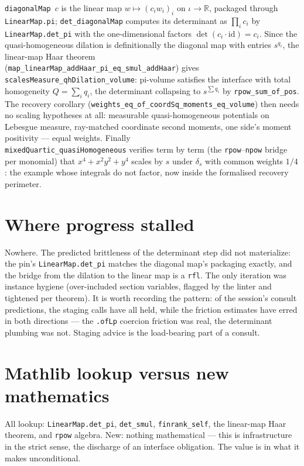 \documentclass[11pt]{article}
\newcommand{\R}{\mathbb{R}}
\newcommand{\code}[1]{\texttt{#1}}
\begin{document}
\code{diagonalMap}~$c$ is the linear map $w \mapsto (c_i w_i)_i$ on
$\iota \to \R$, packaged through \code{LinearMap.pi};
\code{det\_diagonalMap} computes its determinant as $\prod_i c_i$ by
\code{LinearMap.det\_pi} with the one-dimensional factors
$\det(c_i \cdot \mathrm{id}) = c_i$. Since the quasi-homogeneous
dilation is definitionally the diagonal map with entries $s^{q_i}$,
the linear-map Haar theorem\\
(\code{map\_linearMap\_addHaar\_pi\_eq\_smul\_addHaar}) gives\\
\code{scalesMeasure\_qhDilation\_volume}: pi-volume satisfies the
interface with total homogeneity $Q = \sum_i q_i$, the determinant
collapsing to $s^{\sum q_i}$ by \code{rpow\_sum\_of\_pos}. The
recovery corollary
(\code{weights\_eq\_of\_coordSq\_moments\_eq\_volume}) then needs no
scaling hypotheses at all: measurable quasi-homogeneous potentials
on Lebesgue measure, ray-matched coordinate second moments, one
side's moment positivity --- equal weights. Finally\\
\code{mixedQuartic\_quasiHomogeneous} verifies term by term (the
\code{rpow}--\code{npow} bridge per monomial) that
$x^4 + x^2y^2 + y^4$ scales by $s$ under $\delta_s$ with common
weights $1/4$: the example whose integrals do not factor, now inside
the formalised recovery perimeter.

\section{Where progress stalled}

Nowhere. The predicted brittleness of the determinant step did not
materialize: the pin's \code{LinearMap.det\_pi} matches the diagonal
map's packaging exactly, and the bridge from the dilation to the
linear map is a \code{rfl}. The only iteration was instance hygiene
(over-included section variables, flagged by the linter and
tightened per theorem). It is worth recording the pattern: of the
session's consult predictions, the staging calls have all held,
while the friction estimates have erred in both directions --- the
\code{.ofLp} coercion friction was real, the determinant plumbing
was not. Staging advice is the load-bearing part of a consult.

\section{Mathlib lookup versus new mathematics}

All lookup: \code{LinearMap.det\_pi}, \code{det\_smul},
\code{finrank\_self}, the linear-map Haar theorem, and
\code{rpow} algebra. New: nothing mathematical --- this is
infrastructure in the strict sense, the discharge of an interface
obligation. The value is in what it makes unconditional.
\end{document}
